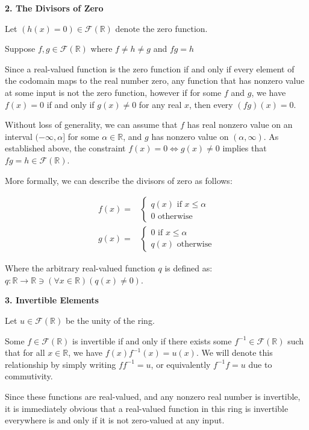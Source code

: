 \documentclass[12pt]{article}
\newcommand{\reals}{\mathbb{R}}
\newcommand{\freals}{\mathcal{F}(\reals)}
\begin{document}
\noindent
\textbf{2. The Divisors of Zero}

Let $(h(x) = 0) \in \freals$ denote the zero function.

Suppose $f,g \in \freals$ where $f \neq h \neq g$ and $fg = h$

Since a real-valued function is the zero function if and only if
every element of the codomain maps to the real number zero,
any function that has nonzero value at some input is not the zero function,
however if for some $f$ and $g$, we have $f(x) = 0$ if and only if $g(x) \neq 0$
for any real $x$, then every $(fg)(x) = 0$.

Without loss of generality,
we can assume that $f$ has real nonzero value
on an interval $(-\infty,\alpha]$ for some $\alpha \in \reals$,
and $g$ has nonzero value on $(\alpha, \infty)$.
As established above, the constraint $f(x) = 0 \iff g(x) \neq 0$
implies that $fg = h \in \freals$.

More formally, we can describe the divisors of zero as follows:

\begin{align}
	f(x) = &
\begin{cases}
	q(x) \textrm{ if } x \le \alpha \\
	0 \textrm{ otherwise}
\end{cases} \\
	g(x) = &
\begin{cases}
	0 \textrm{ if } x \le \alpha \\
	q(x) \textrm{ otherwise}
\end{cases}
\end{align}

Where the arbitrary real-valued function $q$ is defined as:
$q: \reals \to \reals \ni (\forall x \in \reals)(q(x) \neq 0)$.
 
\noindent
\textbf{3. Invertible Elements}

Let $u \in \freals$ be the unity of the ring.

Some $f \in \freals$ is invertible
if and only if
there exists some $f^{-1} \in \freals$
such that for all $x \in \reals$,
we have $f(x)f^{-1}(x) = u(x)$.
We will denote this relationship by simply writing $ff^{-1} = u$,
or equivalently $f^{-1}f = u$ due to commutivity.

Since these functions are real-valued,
and any nonzero real number is invertible,
it is immediately obvious that a real-valued
function in this ring is invertible everywhere
is and only if it is not zero-valued at any input.
\end{document}
